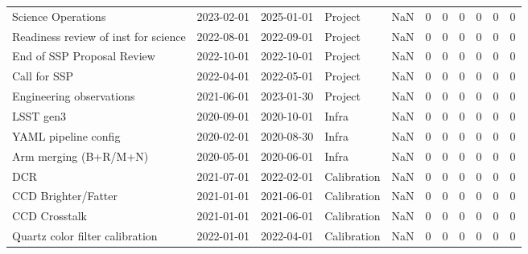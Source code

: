 \begin{longtable}{llllp{2cm}llllll}
                          Science Operations &  2023-02-01 &  2025-01-01 &        Project &                      NaN &      0 &       0 &        0 &       0 &     0 &          0 \\
        Readiness review of inst for science &  2022-08-01 &  2022-09-01 &        Project &                      NaN &      0 &       0 &        0 &       0 &     0 &          0 \\
                  End of SSP Proposal Review &  2022-10-01 &  2022-10-01 &        Project &                      NaN &      0 &       0 &        0 &       0 &     0 &          0 \\
                                Call for SSP &  2022-04-01 &  2022-05-01 &        Project &                      NaN &      0 &       0 &        0 &       0 &     0 &          0 \\
                    Engineering observations &  2021-06-01 &  2023-01-30 &        Project &                      NaN &      0 &       0 &        0 &       0 &     0 &          0 \\
                                   LSST gen3 &  2020-09-01 &  2020-10-01 &          Infra &                      NaN &      0 &       0 &        0 &       0 &     0 &          0 \\
                        YAML pipeline config &  2020-02-01 &  2020-08-30 &          Infra &                      NaN &      0 &       0 &        0 &       0 &     0 &          0 \\
                       Arm merging (B+R/M+N) &  2020-05-01 &  2020-06-01 &          Infra &                      NaN &      0 &       0 &        0 &       0 &     0 &          0 \\
                                         DCR &  2021-07-01 &  2022-02-01 &    Calibration &                      NaN &      0 &       0 &        0 &       0 &     0 &          0 \\
                         CCD Brighter/Fatter &  2021-01-01 &  2021-06-01 &    Calibration &                      NaN &      0 &       0 &        0 &       0 &     0 &          0 \\
                               CCD Crosstalk &  2021-01-01 &  2021-06-01 &    Calibration &                      NaN &      0 &       0 &        0 &       0 &     0 &          0 \\
             Quartz color filter calibration &  2022-01-01 &  2022-04-01 &    Calibration &                      NaN &      0 &       0 &        0 &       0 &     0 &          0 \\

\end{longtable}

